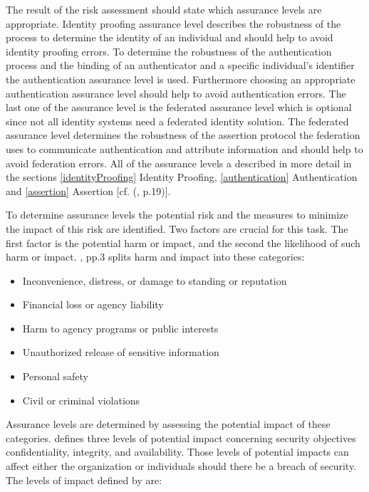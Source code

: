 The result of the risk assessment should state which assurance levels are appropriate. Identity proofing assurance level describes the robustness of the process to determine the identity of an individual and should help to avoid identity proofing errors. To determine the robustness of the authentication process and the binding of an authenticator and a specific individual's identifier the authentication assurance level is used. Furthermore choosing an appropriate authentication assurance level should help to avoid authentication errors. The last one of the assurance level is the federated assurance level which is optional since not all identity systems need a federated identity solution. The federated assurance level determines the robustness of the assertion protocol the federation uses to communicate authentication and attribute information and should help to avoid federation errors. All of the assurance levels a described in more detail in the sections \ref{identityProofing} Identity Proofing, \ref{authentication} Authentication and  \ref{assertion} Assertion [cf. (\cite{NIST:2017:DIG}, p.19)]. 

To determine assurance levels the potential risk and the measures to minimize the impact of this risk are identified. Two factors are crucial for this task. The first factor is the potential harm or impact, and the second the likelihood of such harm or impact. \cite{Bolton:2003:EAuth}, pp.3 splits harm and impact into these categories:

\begin{itemize}
	\item Inconvenience, distress, or damage to standing or reputation
	\item Financial loss or agency liability
	\item Harm to agency programs or public interests
	\item Unauthorized release of sensitive information
	\item Personal safety
	\item Civil or criminal violations
\end{itemize}

Assurance levels are determined by assessing the potential impact of these categories. \cite{NIST:2004:FIOPS} defines three levels of potential impact concerning security objectives confidentiality, integrity, and availability. Those levels of potential impacts can affect either the organization or individuals should there be a breach of security. The levels of impact defined by \cite{NIST:2004:FIOPS} are:

